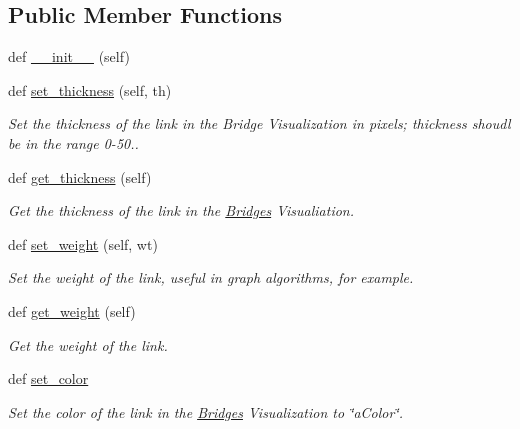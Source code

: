\subsection*{Public Member Functions}
\begin{DoxyCompactItemize}
\item 
def \hyperlink{class_link_visualizer_1_1_link_visualizer_af672a41789fed6cf222a2f531f726944}{\+\_\+\+\_\+init\+\_\+\+\_\+} (self)
\item 
def \hyperlink{class_link_visualizer_1_1_link_visualizer_ac8ef9b117a8c790ecc13174c0d28ab31}{set\+\_\+thickness} (self, th)
\begin{DoxyCompactList}\small\item\em Set the thickness of the link in the Bridge Visualization in pixels; thickness shoudl be in the range 0-\/50.. \end{DoxyCompactList}\item 
def \hyperlink{class_link_visualizer_1_1_link_visualizer_afa1c989f348200429976db98ca91096b}{get\+\_\+thickness} (self)
\begin{DoxyCompactList}\small\item\em Get the thickness of the link in the \hyperlink{namespace_bridges}{Bridges} Visualiation. \end{DoxyCompactList}\item 
def \hyperlink{class_link_visualizer_1_1_link_visualizer_a653ce6a48084bb2b0d506d9ae29d2252}{set\+\_\+weight} (self, wt)
\begin{DoxyCompactList}\small\item\em Set the weight of the link, useful in graph algorithms, for example. \end{DoxyCompactList}\item 
def \hyperlink{class_link_visualizer_1_1_link_visualizer_ac0cedb59b979a4ee18c1f0e149e3dc29}{get\+\_\+weight} (self)
\begin{DoxyCompactList}\small\item\em Get the weight of the link. \end{DoxyCompactList}\item 
def \hyperlink{class_link_visualizer_1_1_link_visualizer_a35d0ecd1bab37fdd82881361999a32c3}{set\+\_\+color}
\begin{DoxyCompactList}\small\item\em Set the color of the link in the \hyperlink{namespace_bridges}{Bridges} Visualization to \char`\"{}a\+Color\char`\"{}. \end{DoxyCompactList}\item 

\end{DoxyCompactItemize}
